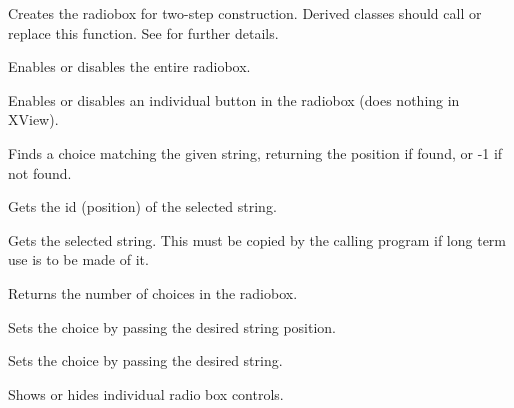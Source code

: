Creates the radiobox for two-step construction. Derived classes
should call or replace this function. See 
for further details.



Enables or disables the entire radiobox.


Enables or disables an individual button in the radiobox (does nothing
in XView).



Finds a choice matching the given string, returning the position if found, or
-1 if not found.



Gets the id (position) of the selected string.



Gets the selected string. This must be copied by the calling program
if long term use is to be made of it.



Returns the number of choices in the radiobox.



Sets the choice by passing the desired string position.



Sets the choice by passing the desired string.



Shows or hides individual radio box controls.


